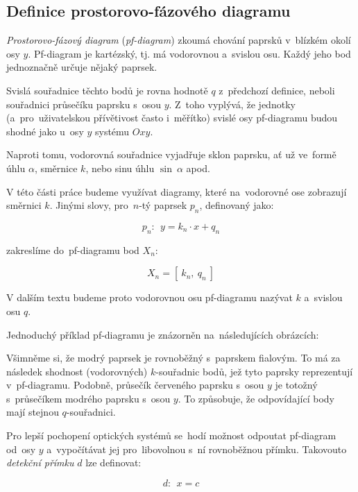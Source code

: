 \subsection{Definice prostorovo-fázového diagramu}

\emph{Prostorovo-fázový diagram} (\emph{pf-diagram}) \parencite{mushaveck2022designing} zkoumá chování paprsků v~blízkém okolí osy $y$. Pf-diagram je kartézský, tj. má vodorovnou a~svislou osu. Každý jeho bod jednoznačně určuje nějaký paprsek.

Svislá souřadnice těchto bodů je rovna hodnotě $q$ z~předchozí definice, neboli souřadnici průsečíku paprsku s~osou $y$. Z~toho vyplývá, že jednotky (a~pro~uživatelskou přívětivost často i~měřítko) svislé osy pf-diagramu budou shodné jako u~osy $y$ systému $Oxy$.

Naproti tomu, vodorovná souřadnice vyjadřuje sklon paprsku, ať už ve~formě úhlu $\alpha$, směrnice $k$, nebo sinu úhlu $\sin\ \alpha$ apod.

V této části práce budeme využívat diagramy, které na~vodorovné ose zobrazují směrnici $k$. Jinými slovy, pro~$n$-tý paprsek $p_n$, definovaný jako:

\[ p_n:\ \ y = k_n \cdot x + q_n \]

zakreslíme do~pf-diagramu bod $X_n$: 

\[ X_n = [\ k_n,\ q_n\ ] \]

V dalším textu budeme proto vodorovnou osu pf-diagramu nazývat $k$ a~svislou osu $q$.

Jednoduchý příklad pf-diagramu je znázorněn na~následujících obrázcích:


Všimněme si, že modrý paprsek je rovnoběžný s~paprskem fialovým. To má za následek shodnost (vodorovných) $k$-souřadnic bodů, jež tyto paprsky reprezentují v~pf-diagramu. Podobně, průsečík červeného paprsku s~osou $y$ je totožný s~průsečíkem modrého paprsku s~osou $y$. To způsobuje, že odpovídající body mají stejnou $q$-sou\-řad\-ni\-ci.

Pro lepší pochopení optických systémů se~hodí možnost odpoutat pf-diagram od~osy $y$ a~vypočítávat jej pro~libovolnou s~ní rovnoběžnou přímku. Takovouto \emph{detekční přímku} $d$ lze definovat:

\[ d:\ \ x = c \]

